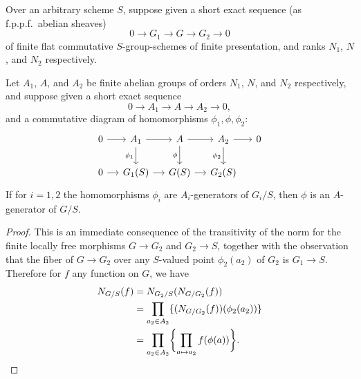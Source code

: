 \begin{proposition}\label{prop:1.11.3}
Over an arbitrary scheme $S$, suppose given a short exact sequence (as f.p.p.f.\ abelian sheaves)
\begin{equation}\label{eq:1.11.3.1}
0 \longrightarrow G_1 \longrightarrow G \longrightarrow G_2 \longrightarrow 0
\end{equation}
of finite flat commutative $S$-group-schemes of finite presentation, and ranks $N_1$, $N$, and $N_2$ respectively.

Let $A_1$, $A$, and $A_2$ be finite abelian groups of orders $N_1$, $N$, and $N_2$ respectively, and suppose given a short exact sequence
\begin{equation}\label{eq:1.11.3.2}
0 \longrightarrow A_1 \longrightarrow A \longrightarrow A_2 \longrightarrow 0,
\end{equation}
and a commutative diagram of homomorphisms $\phi_1, \phi, \phi_2$:
\begin{equation}\label{eq:1.11.3.3}
\begin{tikzcd}[column sep=small]
0 \arrow[r] & A_1 \arrow[r] \arrow[d, "\phi_1"'] & A \arrow[r] \arrow[d, "\phi"'] & A_2 \arrow[r] \arrow[d, "\phi_2"'] & 0 \\
0 \arrow[r] & G_1(S) \arrow[r] & G(S) \arrow[r] & G_2(S)
\end{tikzcd}
\end{equation}
If for $i = 1, 2$ the homomorphisms $\phi_i$ are $A_i$-generators of $G_i/S$, then $\phi$ is an $A$-generator of $G/S$.
\end{proposition}

\begin{proof}
This is an immediate consequence of the transitivity of the norm for the finite locally free morphisms $G \to G_2$ and $G_2 \to S$, together with the observation that the fiber of $G \to G_2$ over any $S$-valued point $\phi_2(a_2)$ of $G_2$ is $G_1 \to S$. Therefore for $f$ any function on $G$, we have
\begin{align*}
N_{G/S}(f) &= N_{G_2/S}(N_{G/G_2}(f)) \\
&= \prod_{a_2 \in A_2} \{ (N_{G/G_2}(f))(\phi_2(a_2)) \} \\
&= \prod_{a_2 \in A_2} \biggl\{ \prod_{a \mapsto a_2} f(\phi(a)) \biggr\}. \qedhere
\end{align*}
\end{proof}

